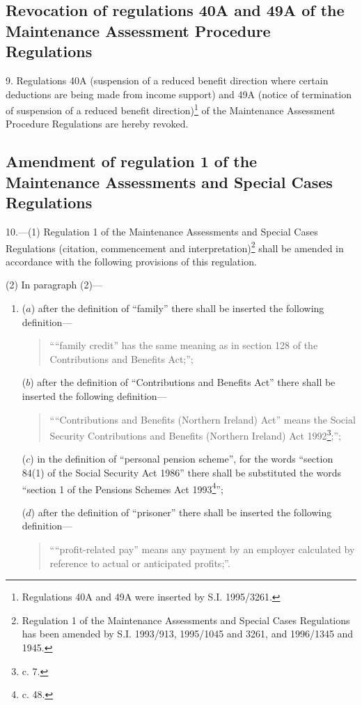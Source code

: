 \documentclass[a4paper]{article}
\begin{document}
\subsection[9. Revocation of regulations 40A and 49A of the Maintenance Assessment Procedure Regulations]{Revocation of regulations 40A and 49A of the Maintenance Assessment Procedure Regulations}

9.  Regulations 40A (suspension of a reduced benefit direction where certain deductions are being made from income support) and 49A (notice of termination of suspension of a reduced benefit direction)\footnote{\frenchspacing Regulations 40A and 49A were inserted by S.I. 1995/3261.} of the Maintenance Assessment Procedure Regulations are hereby revoked.

\subsection[10. Amendment of regulation 1 of the Maintenance Assessments and Special Cases Regulations]{\sloppy Amendment of regulation 1 of the Maintenance Assessments and Special Cases Regulations}

10.—(1) Regulation 1 of the Maintenance Assessments and Special Cases Regulations (citation, commencement and interpretation)\footnote{\frenchspacing Regulation 1 of the Maintenance Assessments and Special Cases Regulations has been amended by S.I. 1993/913, 1995/1045 and 3261, and 1996/1345 and 1945.} shall be amended in accordance with the following provisions of this regulation.

(2) In paragraph (2)—
\begin{enumerate}\item[]
($a$) after the definition of “family” there shall be inserted the following definition—
\begin{quotation}
““family credit” has the same meaning as in section 128 of the Contributions and Benefits Act;”;
\end{quotation}

($b$) after the definition of “Contributions and Benefits Act” there shall be inserted the following definition—
\begin{quotation}
\begin{sloppypar}
““Contributions and Benefits (Northern Ireland) Act” means the Social Security Contributions and Benefits (Northern Ireland) Act 1992\footnote{ c. 7.};”;
\end{sloppypar}
\end{quotation}

($c$) in the definition of “personal pension scheme”, for the words “section 84(1) of the Social Security Act 1986” there shall be substituted the words “section 1 of the Pensions Schemes Act 1993\footnote{ c. 48.}”;

($d$) after the definition of “prisoner” there shall be inserted the following definition—
\begin{quotation}
““profit-related pay” means any payment by an employer calculated by reference to actual or anticipated profits;”.
\end{quotation}
\end{enumerate}
\end{document}
